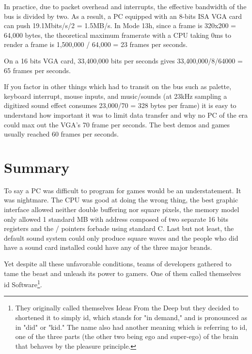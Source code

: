 \documentclass[book.tex]{subfiles}
\begin{document}
 In practice, due to packet overhead and interrupts, the effective bandwidth of the bus is divided by two. As a result, a PC equipped with an 8-bits ISA VGA card can push 19.1Mbits/s/2 = 1.5MB/s. In Mode 13h, since a frame is 320x200 = 64,000 bytes, the theoretical maximum framerate with a CPU taking 0ms to render a frame is 1,500,000 / 64,000 = 23 frames per seconds.\\
 \par
 On a 16 bits VGA card, 33,400,000 bits per seconds gives 33,400,000/8/64000 = 65 frames per seconds.\\
 \par
 If you factor in other things which had to transit on the bus such as palette, keyboard interrupt, mouse inputs, and music/sounds (at 23kHz sampling a digitized sound effect consumes 23,000/70 = 328 bytes per frame) it is easy to understand how important it was to limit data transfer and why no PC of the era could max out the VGA's 70 frame per seconds. The best demos and games usually reached 60 frames per seconds.


\section{Summary}
To say a PC was difficult to program for games would be an understatement. It was nightmare. The CPU was good at doing the wrong thing, the best graphic interface allowed neither double buffering nor square pixels, the memory model only allowed 1 standard MB with address composed of two separate 16 bits registers and the / pointers forbade using standard C. Last but not least, the default sound system could only produce square waves and the people who did have a sound card installed could have any of the three major brands.\\
\par
Yet despite all these unfavorable conditions, teams of developers gathered to tame the beast and unleash its power to gamers. One of them called themselves id Software\footnote{They originally called themselves Ideas From the Deep but they decided to shortened it to simply id, which stands for "in demand," and is pronounced as in "did" or "kid." The name also had another meaning which is referring to id, one of the three parts (the other two being ego and super-ego) of the brain that behaves by the pleasure principle.}.
\end{document}
